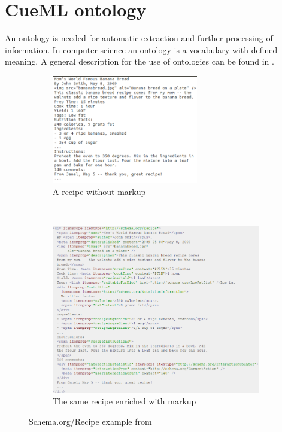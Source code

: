 \documentclass[12pt, twoside]{report}
\begin{document}
\section{CueML ontology}\label{sec:cueMLOntology}
An ontology is needed for automatic extraction and further processing of information. In computer science an ontology is a vocabulary with defined meaning. A general description for the use of ontologies can be found in \parencite{semanticWeb}.

\begin{figure}
	\begin{subfigure}{1\textwidth}
		\centering
		\includegraphics[width=0.7\textwidth]{Images/schemaRecipeWithoutMarkup}
		\caption{A recipe without markup}\vspace{1em}
	\end{subfigure} \\
	\begin{subfigure}{1\textwidth}
		\centering
		\includegraphics[width=1\textwidth]{Images/schemaRecipeWithMarkup}
		\caption{The same recipe enriched with markup}
	\end{subfigure}
	\caption{Schema.org/Recipe example from \parencite{schemaOrg}}
	\label{fig:schemaOrgRecipe}
\end{figure}
\end{document}
